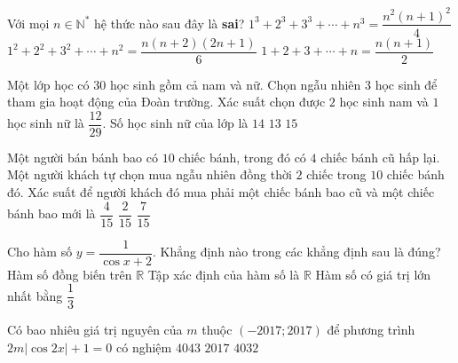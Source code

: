 \begin{ex}%
Với mọi $n\in\mathbb{N^{\ast}}$ hệ thức nào sau đây là \textbf{sai}?
{$1^3+2^3+3^3+\cdots+n^3=\dfrac{n^2(n+1)^2}{4}$}
{\True $1^2+2^2+3^2+\cdots+n^2=\dfrac{n(n+2)(2n+1)}{6}$}
{$1+2+3+\cdots+n=\dfrac{n(n+1)}{2}$}
\end{ex}

\begin{ex}%
Một lớp học có $30$ học sinh gồm cả nam và nữ. Chọn ngẫu nhiên $3$ học sinh để tham gia hoạt động của Đoàn trường. Xác suất chọn được $2$ học sinh nam và $1$ học sinh nữ là $\dfrac{12}{29}$. Số học sinh nữ của lớp là
{\True $14$}
{$13$}
{$15$}
\end{ex}

\begin{ex}%
Một người bán bánh bao có $10$ chiếc bánh, trong đó có $4$ chiếc bánh cũ hấp lại. Một người khách tự chọn mua ngẫu nhiên đồng thời $2$ chiếc trong $10$ chiếc bánh đó. Xác suất để người khách đó mua phải một chiếc bánh bao cũ và một chiếc bánh bao mới là
{$\dfrac{4}{15}$}
{$\dfrac{2}{15}$}
{$\dfrac{7}{15}$}
\end{ex}

\begin{ex}%
Cho hàm số $y=\dfrac{1}{\cos x+2}$. Khẳng định nào trong các khẳng định sau là đúng?
{Hàm số đồng biến trên $\mathbb{R}$}
{\True Tập xác định của hàm số là $\mathbb{R}$}
{Hàm số có giá trị lớn nhất bằng $\dfrac{1}{3}$}
\end{ex}

\begin{ex}%
Có bao nhiêu giá trị nguyên của $m$ thuộc $(-2017;2017)$ để phương trình $2m\left|\cos 2x\right|+1=0$ có nghiệm
{$4043$}
{$2017$}
{$4032$}
\end{ex}

